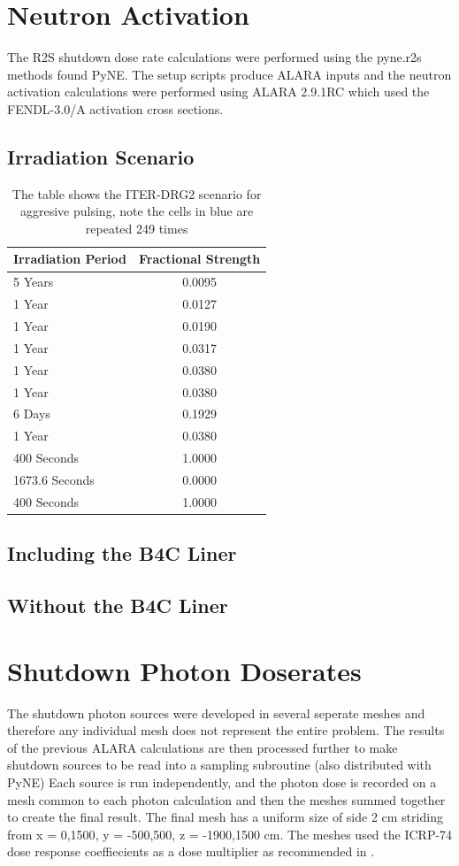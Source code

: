\documentclass[12pt]{article}
\begin{document}
\newpage
\clearpage
\section{Neutron Activation}
The R2S shutdown dose rate calculations were performed using the pyne.r2s methods found PyNE. The setup scripts produce ALARA inputs and the neutron activation calculations were performed using ALARA 2.9.1RC which used the FENDL-3.0/A activation cross sections. 
\subsection{Irradiation Scenario}
\begin{table}[ht!]
   \begin{tabular}{| l | c |}
      \hline 
      Irradiation Period & Fractional Strength \\
      \hline
      5 Years & 0.0095 \\
      1 Year  & 0.0127 \\
      1 Year  & 0.0190 \\
      1 Year  & 0.0317 \\
      1 Year  & 0.0380 \\
      1 Year  & 0.0380 \\
      6 Days  & 0.1929 \\
      1 Year  & 0.0380 \\
      \cellcolor{blue!25} 400 Seconds & 1.0000 \\
      \cellcolor{blue!25}1673.6 Seconds & 0.0000 \\
      400 Seconds & 1.0000 \\
      \hline
\end{tabular}
\caption{The table shows the ITER-DRG2 scenario for aggresive pulsing, note the cells in \textcolor{blue!25}{blue} are repeated 249 times}
\label{tag:irrad_scenario}
\end{table}

\subsection{Including the B4C Liner}
\subsection{Without the B4C Liner}
\newpage
\section{Shutdown Photon Doserates}
The shutdown photon sources were developed in several seperate meshes and therefore any individual mesh does not represent the entire problem. The results of the previous ALARA calculations are then processed further to make shutdown sources to be read into a sampling subroutine (also distributed with PyNE) Each source is run independently, and the photon dose is recorded on a mesh common to each photon calculation and then the meshes summed together to create the final result. The final mesh has a uniform size of side 2 cm striding from x = {0,1500}, y = {-500,500}, z = {-1900,1500} cm. The meshes used the ICRP-74 dose response coeffiecients as a dose multiplier as recommended in \cite{iter_sdr_coeffs}.
\end{document}
